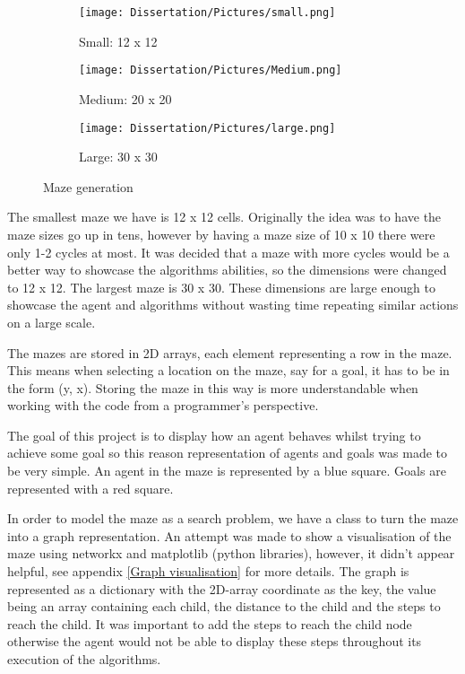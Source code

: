 \documentclass[]{final_report}
\begin{document}
\begin{figure}[h]
     \centering
     \begin{subfigure}[h]{0.3\textwidth}
         \centering
         \texttt{[image: Dissertation/Pictures/small.png]}
         \caption{Small: 12 x 12}
     \end{subfigure}
     \hfill
     \begin{subfigure}[h]{0.3\textwidth}
         \centering
         \texttt{[image: Dissertation/Pictures/Medium.png]}         
         \caption{Medium: 20 x 20}
     \end{subfigure}
     \hfill
     \begin{subfigure}[h]{0.3\textwidth}
         \centering
         \texttt{[image: Dissertation/Pictures/large.png]}
         \caption{Large: 30 x 30}
     \end{subfigure}
     \caption{Maze generation}
     \label{fig: original mazes}
\end{figure}

The smallest maze we have is 12 x 12 cells. Originally the idea was to have the maze sizes go up in tens, however by having a maze size of 10 x 10 there were only 1-2 cycles at most. It was decided that a maze with more cycles would be a better way to showcase the algorithms abilities, so the dimensions were changed to 12 x 12. The largest maze is 30 x 30. These dimensions are large enough to showcase the agent and algorithms without wasting time repeating similar actions on a large scale.

The mazes are stored in 2D arrays, each element representing a row in the maze. This means when selecting a location on the maze, say for a goal, it has to be in the form (y, x). Storing the maze in this way is more understandable when working with the code from a programmer's perspective.

The goal of this project is to display how an agent behaves whilst trying to achieve some goal so this reason representation of agents and goals was made to be very simple. An agent in the maze is represented by a blue square. Goals are represented with a red square.

In order to model the maze as a search problem, we have a class to turn the maze into a graph representation. An attempt was made to show a visualisation of the maze using networkx and matplotlib (python libraries), however, it didn't appear helpful, see appendix \ref{Graph visualisation} for more details. The graph is represented as a dictionary with the 2D-array coordinate as the key, the value being an array containing each child, the distance to the child and the steps to reach the child. It was important to add the steps to reach the child node otherwise the agent would not be able to display these steps throughout its execution of the algorithms.
\end{document}
